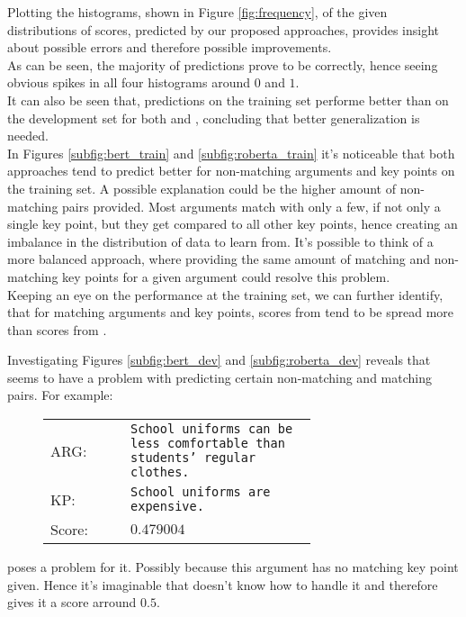 Plotting the histograms, shown in Figure \ref{fig:frequency}, of the given distributions of scores, predicted by our proposed approaches, provides 
insight about possible errors and therefore possible improvements.\\
As can be seen, the majority of predictions prove to be correctly, hence seeing obvious spikes in all four histograms around $0$ and $1$.\\
It can also be seen that, predictions on the training set performe better than on the development set for both 
\Roberta and \Bert, concluding that better generalization is needed.\\
In Figures \ref{subfig:bert_train} and \ref{subfig:roberta_train} it's noticeable that
both approaches tend to predict better for non-matching arguments and key points on the training set. A possible explanation 
could be the higher amount of non-matching pairs provided. Most arguments match with only a few, if 
not only a single key point, but they get compared to all other key points, hence creating an imbalance in the distribution 
of data to learn from. It's possible to think of a more balanced approach, where providing the same amount of matching and 
non-matching key points for a given argument could resolve this problem.\\
Keeping an eye on the performance at the training set, we can further identify, that for matching arguments and key points, 
scores from \Bert tend to be spread more than scores from \Roberta.

Investigating Figures \ref{subfig:bert_dev} and \ref{subfig:roberta_dev} reveals that \Bert seems to have a problem with 
predicting certain non-matching and matching pairs. For example: \\

\begin{figure}[H]
    \begin{tabularx}{\linewidth}{lp{0.7\linewidth}}
            ARG: & \texttt{School uniforms can be less comfortable than students' regular clothes.}\\
            KP: & \texttt{School uniforms are expensive.}\\
            Score:& $0.479004$\\
    \end{tabularx}
\end{figure}

poses a problem for it. Possibly because this argument has no matching key point given. Hence it's imaginable that 
\Bert doesn't know how to handle it and therefore gives it a score arround $0.5$.

